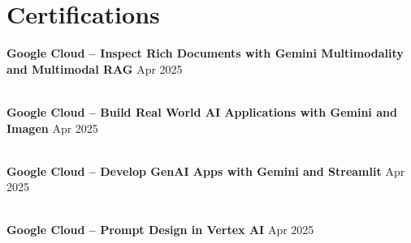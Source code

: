 \documentclass[letterpaper,10.5pt]{article}
\begin{document}
\section{Certifications}
\begin{itemize}[leftmargin=0.19in, label={}]
\small{\item{

\textbf{Google Cloud -- Inspect Rich Documents with Gemini Multimodality and Multimodal RAG}
\hfill Apr 2025

\\[2pt]

\textbf{Google Cloud -- Build Real World AI Applications with Gemini and Imagen}
\hfill Apr 2025

\\[2pt]

\textbf{Google Cloud -- Develop GenAI Apps with Gemini and Streamlit}
\hfill Apr 2025

\\[2pt]

\textbf{Google Cloud -- Prompt Design in Vertex AI}
\hfill Apr 2025

}}
\end{itemize}

\end{document}
